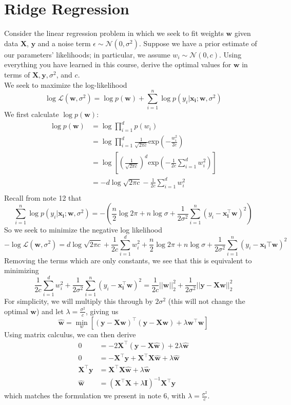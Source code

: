 \documentclass{article}
\begin{document}
\section{Ridge Regression}
Consider the linear regression problem in which we seek to fit weights $\mathbf{w}$ given data $\mathbf{X}$, $\mathbf{y}$ and a noise term $\epsilon \sim \mathcal{N}(0, \sigma^2)$. Suppose we have a prior estimate of our parameters' likelihoods; in particular, we assume $w_i \sim \mathcal{N}(0, c)$. Using everything you have learned in this course, derive the optimal values for $\mathbf{w}$ in terms of $\mathbf{X, y}, \sigma^2$, and $c$. \\
{\color{blue}
We seek to maximize the log-likelihood $$\log\mathcal{L}(\mathbf{w}, \sigma^2) = \log p(\mathbf{w}) + \sum_{i=1}^n \log p(y_i | \mathbf{x_i}; \mathbf{w}, \sigma^2)$$
We first calculate $\log p(\mathbf{w})$:
\begin{align*}
\log p(\mathbf{w}) &= \log \prod_{i=1}^d p(w_i) \\
&= \log\prod_{i=1}^d \frac{1}{\sqrt{2\pi c}}\text{exp}(-\frac{w_i^2}{2c}) \\
&= \log[(\frac{1}{\sqrt{2\pi c}})^d\text{exp}(-\frac{1}{2c}\sum_{i=1}^d w_i^2)] \\
&= -d\log \sqrt{2\pi c} - \frac{1}{2c}\sum_{i=1}^d w_i^2 \\
\end{align*}
Recall from note 12 that $$\sum_{i=1}^n \log p(y_i | \mathbf{x_i}; \mathbf{w}, \sigma^2) = -(\frac{n}{2}\log 2\pi + n\log\sigma + \frac{1}{2\sigma^2}\sum_{i=1}^n(y_i - \mathbf{x_i^\top w})^2)$$
So we seek to minimize the negative log likelihood $$-\log\mathcal{L}(\mathbf{w}, \sigma^2) = d\log\sqrt{2\pi c} + \frac{1}{2c}\sum_{i=1}^d w_i^2 + \frac{n}{2}\log 2\pi + n\log\sigma + \frac{1}{2\sigma^2}\sum_{i=1}^n(y_i - \mathbf{x_i\top w})^2$$
Removing the terms which are only constants, we see that this is equivalent to minimizing $$\frac{1}{2c}\sum_{i=1}^d w_i^2 + \frac{1}{2\sigma^2}\sum_{i=1}^n(y_i - \mathbf{x_i^\top w})^2 = \frac{1}{2c}||\mathbf{w}||_2^2 + \frac{1}{2\sigma^2}||\mathbf{y - Xw}||_2^2$$
For simplicity, we will multiply this through by $2\sigma^2$ (this will not change the optimal $\mathbf{w}$) and let $\lambda = \frac{\sigma^2}{c}$, giving us $$\hat{\mathbf{w}} = \min_{w}[(\mathbf{y - Xw})^\top(\mathbf{y-Xw}) + \lambda\mathbf{w^\top w}]$$
Using matrix calculus, we can then derive 
\begin{align*}
0 &= -2\mathbf{X}^\top(\mathbf{y - X\hat{w}}) + 2\lambda\mathbf{\hat{w}} \\
0 &= -\mathbf{X^\top y} + \mathbf{X^\top X\hat{w}} + \lambda\hat{\mathbf{w}} \\
\mathbf{X^\top y} &= \mathbf{X^\top X\hat{w}} + \lambda\mathbf{\hat{w}} \\
\mathbf{\hat{w}} &= (\mathbf{X^\top X} + \lambda\mathbf{I})^{-1}\mathbf{X^\top y}
\end{align*}
which matches the formulation we present in note 6, with $\lambda = \frac{\sigma^2}{c}$.
}
\end{document}
